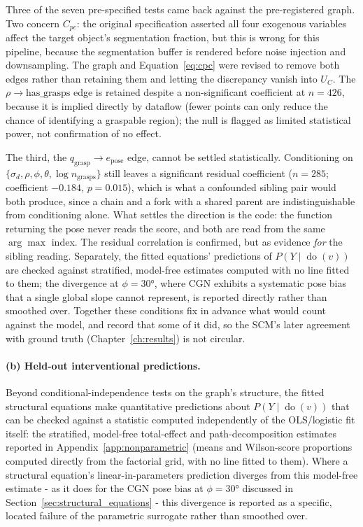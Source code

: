 \documentclass[11pt,a4paper]{report}
\newcommand{\doop}{\operatorname{do}}
\begin{document}
Three of the seven pre-specified tests came back against the pre-registered graph. Two concern $C_{pc}$: the original specification asserted all four exogenous variables affect the target object's segmentation fraction, but this is wrong for this pipeline, because the segmentation buffer is rendered before noise injection and downsampling. The graph and Equation~\eqref{eq:cpc} were revised to remove both edges rather than retaining them and letting the discrepancy vanish into $U_C$. The $\rho \to \text{has\_grasps}$ edge is retained despite a non-significant coefficient at $n=426$, because it is implied directly by dataflow (fewer points can only reduce the chance of identifying a graspable region); the null is flagged as limited statistical power, not confirmation of no effect.

The third, the $q_{\text{grasp}} \to e_{\text{pose}}$ edge, cannot be settled statistically. Conditioning on $\{\sigma_d,\rho,\phi,\theta,\log n_{\text{grasps}}\}$ still leaves a significant residual coefficient ($n=285$; coefficient $-0.184$, $p=0.015$), which is what a confounded sibling pair would both produce, since a chain and a fork with a shared parent are indistinguishable from conditioning alone. What settles the direction is the code: the function returning the pose never reads the score, and both are read from the same $\arg\max$ index. The residual correlation is confirmed, but as evidence \emph{for} the sibling reading. Separately, the fitted equations' predictions of $P(Y \mid \doop(v))$ are checked against stratified, model-free estimates computed with no line fitted to them; the divergence at $\phi=30°$, where CGN exhibits a systematic pose bias that a single global slope cannot represent, is reported directly rather than smoothed over. Together these conditions fix in advance what would count against the model, and record that some of it did, so the SCM's later agreement with ground truth (Chapter~\ref{ch:results}) is not circular.

\paragraph{(b) Held-out interventional predictions.} Beyond conditional-independence tests on the graph's structure, the fitted structural equations make quantitative predictions about $P(Y \mid \doop(v))$ that can be checked against a statistic computed independently of the OLS/logistic fit itself: the stratified, model-free total-effect and path-decomposition estimates reported in Appendix~\ref{app:nonparametric} (means and Wilson-score proportions computed directly from the factorial grid, with no line fitted to them). Where a structural equation's linear-in-parameters prediction diverges from this model-free estimate - as it does for the CGN pose bias at $\phi=30°$ discussed in Section~\ref{sec:structural_equations} - this divergence is reported as a specific, located failure of the parametric surrogate rather than smoothed over.
\end{document}
